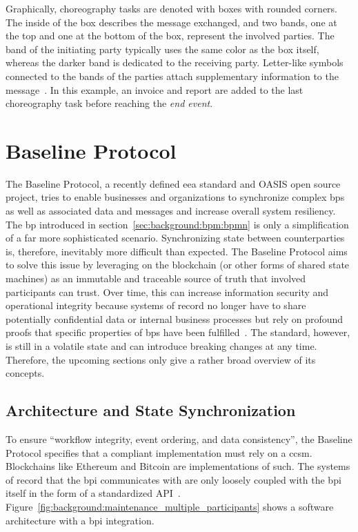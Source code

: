Graphically, choreography tasks are denoted with boxes with rounded corners. The inside of the box describes the message exchanged, and two bands, one at the top and one at the bottom of the box, represent the involved parties. The band of the initiating party typically uses the same color as the box itself, whereas the darker band is dedicated to the receiving party. Letter-like symbols connected to the bands of the parties attach supplementary information to the message~\cite{trust_in_service_oriented_ds_through_blockchain,bpmn_v2_spec}. In this example, an invoice and report are added to the last choreography task before reaching the \textit{end event}.




\section{Baseline Protocol}
\label{sec:background:baseline_protocol}
The Baseline Protocol, a recently defined \gls{eea} standard and OASIS open source project, tries to enable businesses and organizations to synchronize complex \glspl{bp} as well as associated data and messages and increase overall system resiliency. The \gls{bp} introduced in section~\ref{sec:background:bpm:bpmn} is only a simplification of a far more sophisticated scenario. Synchronizing state between counterparties is, therefore, inevitably more difficult than expected. The Baseline Protocol aims to solve this issue by leveraging on the blockchain (or other forms of shared state machines) as an immutable and traceable source of truth that involved participants can trust. Over time, this can increase information security and operational integrity because systems of record no longer have to share potentially confidential data or internal business processes but rely on profound proofs that specific properties of \glspl{bp} have been fulfilled~\cite{baseline_spec}. The standard, however, is still in a volatile state and can introduce breaking changes at any time. Therefore, the upcoming sections only give a rather broad overview of its concepts.


\subsection{Architecture and State Synchronization}
\label{sec:background:baseline_protocol:architecture}
To ensure ``workflow integrity, event ordering, and data consistency'', the Baseline Protocol specifies that a compliant implementation must rely on a \gls{ccsm}. Blockchains like Ethereum and Bitcoin are implementations of such. The systems of record that the \gls{bpi} communicates with are only loosely coupled with the \gls{bpi} itself in the form of a standardized API~\cite{baseline_spec}. Figure~\ref{fig:background:maintenance_multiple_participants} shows a software architecture with a \gls{bpi} integration.

